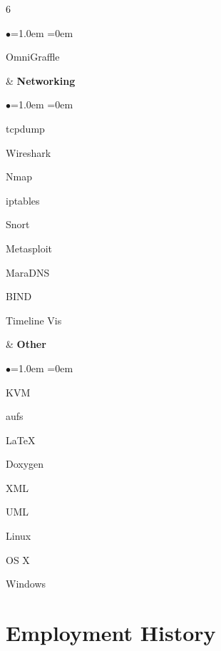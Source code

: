 \documentclass[margin,line]{resume}
\newenvironment{skills}{
  \begin{list}{\small$\bullet$}{\leftmargin=1.0em \itemindent=0em \small}
}{
  \end{list}
}
\begin{document}
\begin{resume}
\begin{ncolumn}{6}
\begin{skills}
  \item OmniGraffle
  \end{skills}
&
{\small\bf Networking}
  \begin{skills}
  \item tcpdump
  \item Wireshark
  \item Nmap
  \item iptables
  \item Snort
  \item Metasploit
  \item MaraDNS
  \item BIND
  \item Timeline Vis
  \end{skills}
&
{\small\bf Other}
  \begin{skills}
  \item KVM
  \item aufs
  \item \LaTeX
  \item Doxygen
  \item XML
  \item UML
  \item Linux
  \item OS X
  \item Windows
  \end{skills}
\end{ncolumn}

\section{Employment History}


\end{resume}
\end{document}
